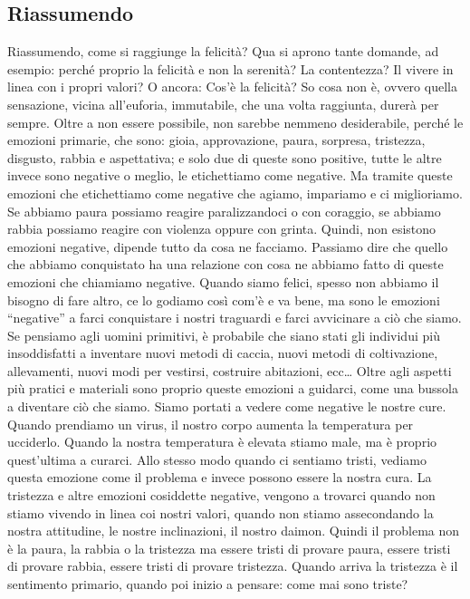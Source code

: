 \documentclass[12pt]{book} %
\begin{document}
\subsection{Riassumendo}
Riassumendo, come si raggiunge la felicità? Qua si aprono tante domande, ad esempio: perché proprio la felicità e non la
serenità? La contentezza? Il vivere in linea con i propri valori? O ancora: Cos'è la felicità? So
cosa non è, ovvero quella sensazione, vicina all'euforia, immutabile, che una volta raggiunta,
durerà per sempre. Oltre a non essere possibile, non sarebbe nemmeno desiderabile, perché le emozioni primarie, che
sono: gioia, approvazione, paura, sorpresa, tristezza, disgusto, rabbia e aspettativa; e solo due di queste sono
positive, tutte le altre invece sono negative o meglio, le etichettiamo come negative. Ma tramite queste
emozioni che etichettiamo come negative che agiamo, impariamo e ci miglioriamo. Se abbiamo paura possiamo reagire
paralizzandoci o con coraggio, se abbiamo rabbia possiamo reagire con violenza oppure con grinta. Quindi, non esistono
emozioni negative, dipende tutto da cosa ne facciamo. Passiamo dire che quello che abbiamo conquistato ha una relazione con cosa ne
abbiamo fatto di queste emozioni che chiamiamo negative. Quando siamo felici, spesso non abbiamo il bisogno di fare altro, ce lo godiamo così com'è e va bene, ma sono le emozioni
“negative” a farci conquistare i nostri traguardi e farci avvicinare a ciò che siamo. Se pensiamo agli uomini
primitivi, è probabile che siano stati gli individui più insoddisfatti a inventare nuovi metodi di caccia, nuovi metodi di
coltivazione, allevamenti, nuovi modi per vestirsi, costruire abitazioni, ecc… Oltre agli aspetti più pratici e
materiali sono proprio queste emozioni a guidarci, come una bussola a diventare ciò che siamo. Siamo portati a vedere
come negative le nostre cure. Quando prendiamo un virus, il nostro corpo aumenta la temperatura per ucciderlo. Quando
la nostra temperatura è elevata stiamo male, ma è proprio quest'ultima a curarci. Allo stesso modo
quando ci sentiamo tristi, vediamo questa emozione come il problema e invece possono essere la nostra cura. La tristezza e altre
emozioni cosiddette negative, vengono a trovarci quando non stiamo vivendo in linea coi nostri valori, quando non
stiamo assecondando la nostra attitudine, le nostre inclinazioni, il nostro daimon. Quindi il problema non è la paura,
la rabbia o la tristezza ma essere tristi di provare paura, essere tristi di provare rabbia, essere tristi di provare
tristezza. Quando arriva la tristezza è il sentimento primario, quando poi inizio a pensare: come mai sono triste?
\end{document}
